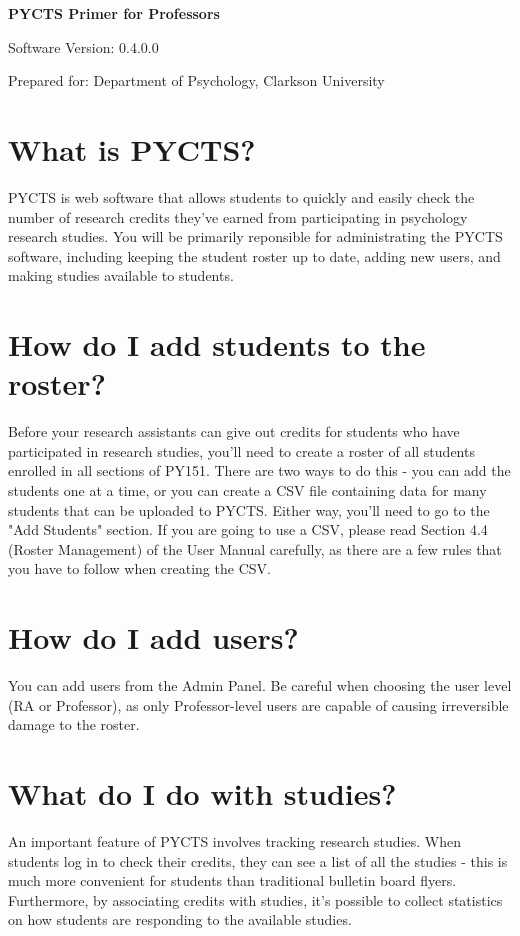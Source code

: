\documentclass[letterpaper]{article}
\newcommand{\softwareversion}{0.4.0.0}
\begin{document}
\begin{center}
{\bf {\huge PYCTS Primer for Professors } }

Software Version: \softwareversion

Prepared for: Department of Psychology, Clarkson University
\end{center}

\section{What is PYCTS?}
PYCTS is web software that allows students to quickly and easily check the number of research credits they've earned from participating in psychology research studies. You will be primarily reponsible for administrating the PYCTS software, including keeping the student roster up to date, adding new users, and making studies available to students.

\section{How do I add students to the roster?}
Before your research assistants can give out credits for students who have participated in research studies, you'll need to create a roster of all students enrolled in all sections of PY151. There are two ways to do this - you can add the students one at a time, or you can create a CSV file containing data for many students that can be uploaded to PYCTS. Either way, you'll need to go to the "Add Students" section. If you are going to use a CSV, please read Section 4.4 (Roster Management) of the User Manual carefully, as there are a few rules that you have to follow when creating the CSV.

\section{How do I add users?}
You can add users from the Admin Panel. Be careful when choosing the user level (RA or Professor), as only Professor-level users are capable of causing irreversible damage to the roster.

\section{What do I do with studies?}
An important feature of PYCTS involves tracking research studies. When students log in to check their credits, they can see a list of all the studies - this is much more convenient for students than traditional bulletin board flyers. Furthermore, by associating credits with studies, it's possible to collect statistics on how students are responding to the available studies.
\end{document}
